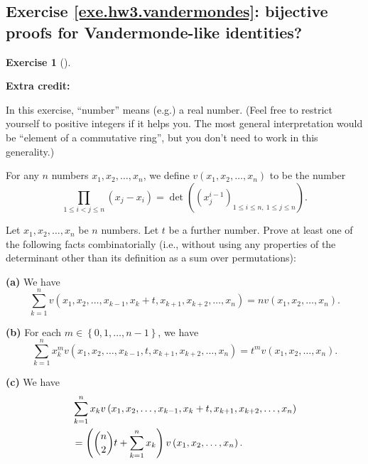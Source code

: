 \documentclass[numbers=enddot,12pt,final,onecolumn,notitlepage]{scrartcl}%
\newcounter{exer}
\theoremstyle{definition}
\newtheorem{exmp}[exer]{Exercise}
\newenvironment{exercise}[1][]
{\begin{exmp}[#1]\begin{leftbar}}
{\end{leftbar}\end{exmp}}
\let\sumnonlimits\sum
\let\prodnonlimits\prod
\renewcommand{\sum}{\sumnonlimits\limits}
\renewcommand{\prod}{\prodnonlimits\limits}
\newcommand{\tup}[1]{\left( #1 \right)}
\begin{document}
\newpage

\subsection{Exercise \ref{exe.hw3.vandermondes}: bijective proofs for
Vandermonde-like identities?}

\begin{exercise} \label{exe.hw3.vandermondes}
\textbf{Extra credit:}

In this exercise, ``number'' means (e.g.) a real number. (Feel
free to restrict yourself to positive integers  if it helps you.
The most general interpretation would be ``element of a commutative
ring'', but you don't need to work in this generality.)

For any $n$ numbers $x_1, x_2, \ldots, x_n$, we define
$v\left(x_1, x_2, \ldots, x_n\right)$ to be the number
\[
 \prod_{1\leq i<j\leq n} \left( x_j - x_i \right)
 =
 \det \tup{ \tup{ x_j^{i-1} }_{1\leq i\leq n, \  1\leq j\leq n } } .
\]

Let $x_1, x_2, \ldots, x_n$ be $n$ numbers. Let $t$
be a further number.
Prove
at least one of the following facts combinatorially
(i.e., without using any properties of the determinant
other than its definition as a sum over permutations):

\textbf{(a)} We have
\[
\sum_{k=1}^{n} v\left(  x_{1},x_{2},\ldots,x_{k-1},x_{k}+t,x_{k+1}%
,x_{k+2},\ldots,x_{n}\right)
= n v\left(  x_{1},x_{2},\ldots,x_{n}\right)  .
\]

\textbf{(b)} For each $m\in\left\{ 0,1,\ldots,n-1\right\}  $, we have
\[
\sum_{k=1}^{n}x_{k}^{m}v\left(  x_{1},x_{2},\ldots,x_{k-1},t,x_{k+1}%
,x_{k+2},\ldots,x_{n}\right)
= t^{m}v\left(  x_{1},x_{2},\ldots,x_{n}\right)
.
\]

\textbf{(c)} We have
\begin{align*}
&  \sum_{k=1}^{n}x_{k}v\left(  x_{1},x_{2},\ldots,x_{k-1},x_{k}+t,x_{k+1}%
,x_{k+2},\ldots,x_{n}\right) \\
&  =\left(  \dbinom{n}{2}t+\sum_{k=1}^{n}x_{k}\right)  v\left(  x_{1}%
,x_{2},\ldots,x_{n}\right)  .
\end{align*}

\end{exercise}
\end{document}
